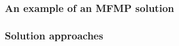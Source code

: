 \begin{frame}[t]
\frametitle{\textbf{An example of an MFMP solution}}
  
\end{frame}


  
  

\begin{frame}[noframenumbering]
\frametitle{\textbf{Solution approaches}}
  \begin{block}{\textbf{\firsttitleF}}
  \end{block}  

\end{frame}

